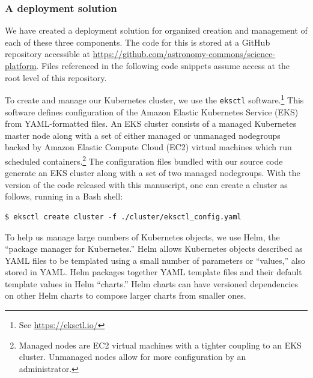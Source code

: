 \documentclass[twocolumn, linenumbers]{aastex631}
\begin{document}
\subsubsection{A deployment solution}
\label{sec:deployment}

We have created a deployment solution for organized creation and management of each of these three components. The code for this is stored at a GitHub repository accessible at \url{https://github.com/astronomy-commons/science-platform}. Files referenced in the following code snippets assume access at the root level of this repository.

To create and manage our Kubernetes cluster, we use the \texttt{eksctl} software.\footnote{See \url{https://eksctl.io/}} This software defines configuration of the Amazon Elastic Kubernetes Service (EKS) from YAML-formatted files. An EKS cluster consists of a managed Kubernetes master node along with a set of either managed or unmanaged nodegroups backed by Amazon Elastic Compute Cloud (EC2) virtual machines which run scheduled containers.\footnote{Managed nodes are EC2 virtual machines with a tighter coupling to an EKS cluster. Unmanaged nodes allow for more configuration by an administrator.} The configuration files bundled with our source code generate an EKS cluster along with a set of two managed nodegroups. With the version of the code released with this manuscript, one can create a cluster as follows, running in a Bash shell:
\begin{lstlisting}[gobble=0]
$ eksctl create cluster -f ./cluster/eksctl_config.yaml
\end{lstlisting}
To help us manage large numbers of Kubernetes objects, we use Helm, the ``package manager for Kubernetes.'' Helm allows Kubernetes objects described as YAML files to be templated using a small number of parameters or ``values,'' also stored in YAML. Helm packages together YAML template files and their default template values in Helm ``charts.'' Helm charts can have versioned dependencies on other Helm charts to compose larger charts from smaller ones. 
\end{document}

